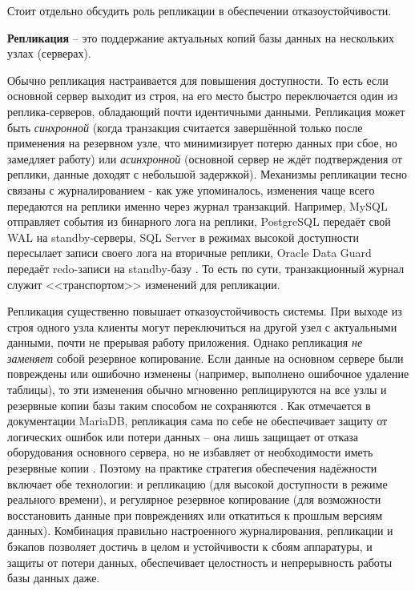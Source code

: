  Стоит отдельно обсудить роль репликации в обеспечении отказоустойчивости. 
 \begin{grayquote}
    \textbf{Репликация} – это поддержание актуальных копий базы данных на нескольких узлах (серверах). 
 \end{grayquote}
 
 Обычно репликация настраивается для повышения доступности. То есть если основной сервер выходит из строя, на его место быстро переключается один из реплика-серверов, обладающий почти идентичными данными. Репликация может быть \textit{синхронной} (когда транзакция считается завершённой только после применения на резервном узле, что минимизирует потерю данных при сбое, но замедляет работу) или \textit{асинхронной} (основной сервер не ждёт подтверждения от реплики, данные доходят с небольшой задержкой). Механизмы репликации тесно связаны с журналированием - как уже упоминалось, изменения чаще всего передаются на реплики именно через журнал транзакций. Например, MySQL отправляет события из бинарного лога на реплики, PostgreSQL передаёт свой WAL на standby-серверы, SQL Server в режимах высокой доступности пересылает записи своего лога на вторичные реплики, Oracle Data Guard передаёт redo-записи на standby-базу \autocites{Mysqldoc7}{MicrosoftLearnSQLserverTransLog}. То есть по сути, транзакционный журнал служит <<транспортом>> изменений для репликации. 
 
 Репликация существенно повышает отказоустойчивость системы. При выходе из строя одного узла клиенты могут переключиться на другой узел с актуальными данными, почти не прерывая работу приложения. Однако репликация \textit{не заменяет} собой резервное копирование. Если данные на основном сервере были повреждены или ошибочно изменены (например, выполнено ошибочное удаление таблицы), то эти изменения обычно мгновенно реплицируются на все узлы и резервные копии базы таким способом не сохраняются \autocite{mariaBackup}. Как отмечается в документации MariaDB, репликация сама по себе не обеспечивает защиту от логических ошибок или потери данных – она лишь защищает от отказа оборудования основного сервера, но не избавляет от необходимости иметь резервные копии \autocite{mariaBackup}. Поэтому на практике стратегия обеспечения надёжности включает обе технологии: и репликацию (для высокой доступности в режиме реального времени), и регулярное резервное копирование (для возможности восстановить данные при повреждениях или откатиться к прошлым версиям данных). Комбинация правильно настроенного журналирования, репликации и бэкапов позволяет достичь в целом и устойчивости к сбоям аппаратуры, и защиты от потери данных, обеспечивает целостность и непрерывность работы базы данных даже.